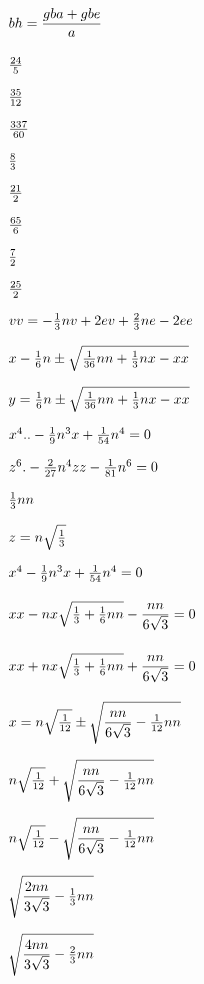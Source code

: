 $bh = {\displaystyle\strut {gba + gbe}\over \displaystyle\strut a}$\par\vfill\eject
${24\over 5}$\par\vfill\eject
${35\over 12}$\par\vfill\eject
${337\over 60}$\par\vfill\eject
${8\over 3}$\par\vfill\eject
${21\over 2}$\par\vfill\eject
${65\over 6}$\par\vfill\eject
${7\over 2}$\par\vfill\eject
${25\over 2}$\par\vfill\eject
$vv = - {{1\over 3}}nv + 2ev + {{2\over 3}}ne - 2ee$\par\vfill\eject
$x - {{1\over 6}}n \pm  \sqrt{{{1\over 36}}nn + {{1\over 3}}nx - xx}$\par\vfill\eject
$y = {{1\over 6}}n \pm  \sqrt{{{1\over 36}}nn + {{1\over 3}}nx - xx}$\par\vfill\eject
$x^{4}.. - {{1\over 9}}n^{3}x + {{1\over 54}}n^{4} = 0$\par\vfill\eject
$z^{6}. - {{2\over 27}}n^{4}zz - {{1\over 81}}n^{6} = 0$\par\vfill\eject
${{1\over 3}}nn$\par\vfill\eject
$z = n\sqrt{{{1\over 3}}}$\par\vfill\eject
$x^{4} - {{1\over 9}}n^{3}x + {{1\over 54}}n^{4} = 0$\par\vfill\eject
$xx - nx\sqrt{{{1\over 3}} + {{1\over 6}}nn} - {\displaystyle\strut {nn}\over \displaystyle\strut {6\sqrt{ 3}}} = 0$\par\vfill\eject
$xx + nx\sqrt{{{1\over 3}} + {{1\over 6}}nn} + {\displaystyle\strut {nn}\over \displaystyle\strut {6\sqrt{ 3}}} = 0$\par\vfill\eject
$x = n\sqrt{{{1\over 12}}} \pm  \sqrt{{\displaystyle\strut {nn}\over \displaystyle\strut {6\sqrt{3}}} - {{1\over 12}}nn}$\par\vfill\eject
$n\sqrt{{{1\over 12}}} + \sqrt{{\displaystyle\strut {nn}\over \displaystyle\strut {6\sqrt{3}}} - {{1\over 12}}nn}$\par\vfill\eject
$n\sqrt{{{1\over 12}}} - \sqrt{{\displaystyle\strut {nn}\over \displaystyle\strut {6\sqrt{3}}} - {{1\over 12}}nn}$\par\vfill\eject
$\sqrt{{\displaystyle\strut {2nn}\over \displaystyle\strut {3\sqrt{3}}} - {{1\over 3}}nn}$\par\vfill\eject
$\sqrt{{\displaystyle\strut {4nn}\over \displaystyle\strut {3\sqrt{3}}} - {{2\over 3}}nn}$\par\vfill\eject
